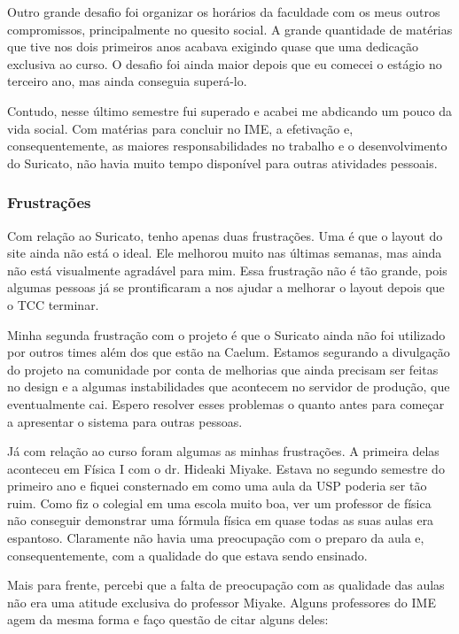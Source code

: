 \documentclass[titlepage,a4paper]{article}
\newcommand{\suricato}{Suricato}
\begin{document}
Outro grande desafio foi organizar os horários da faculdade com os meus outros compromissos, principalmente no quesito social. A grande quantidade de matérias que tive nos dois primeiros anos acabava exigindo quase que uma dedicação exclusiva ao curso. O desafio foi ainda maior depois que eu comecei o estágio no terceiro ano, mas ainda conseguia superá-lo.

Contudo, nesse último semestre fui superado e acabei me abdicando um pouco da vida social. Com matérias para concluir no IME, a efetivação e, consequentemente, as maiores responsabilidades no trabalho e o desenvolvimento do \suricato{}, não havia muito tempo disponível para outras atividades pessoais.

\subsubsection*{Frustrações}

Com relação ao \suricato{}, tenho apenas duas frustrações. Uma é que o layout do site ainda não está o ideal. Ele melhorou muito nas últimas semanas, mas ainda não está visualmente agradável para mim. Essa frustração não é tão grande, pois algumas pessoas já se prontificaram a nos ajudar a melhorar o layout depois que o TCC terminar.

Minha segunda frustração com o projeto é que o \suricato{} ainda não foi utilizado por outros times além dos que estão na Caelum. Estamos segurando a divulgação do projeto na comunidade por conta de melhorias que ainda precisam ser feitas no design e a algumas instabilidades que acontecem no servidor de produção, que eventualmente cai. Espero resolver esses problemas o quanto antes para começar a apresentar o sistema para outras pessoas.

Já com relação ao curso foram algumas as minhas frustrações.  A primeira delas aconteceu em Física I com o dr. Hideaki Miyake. Estava no segundo semestre do primeiro ano e fiquei consternado em como uma aula da USP poderia ser tão ruim. Como fiz o colegial em uma escola muito boa, ver um professor de física não conseguir demonstrar uma fórmula física em quase todas as suas aulas era espantoso. Claramente não havia uma preocupação com o preparo da aula e, consequentemente, com a qualidade do que estava sendo ensinado.

Mais para frente, percebi que a falta de preocupação com as qualidade das aulas não era uma atitude exclusiva do professor Miyake. Alguns professores do IME agem da mesma forma e faço questão de citar alguns deles:
\end{document}
